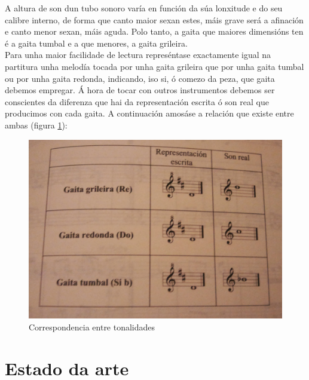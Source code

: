  A altura de son dun tubo sonoro varía en función da súa lonxitude e do seu
 calibre interno, de forma que canto maior sexan estes, máis grave será a
 afinación e canto menor sexan, máis aguda. Polo tanto, a gaita que maiores
 dimensións ten é a gaita tumbal e a que menores, a gaita grileira. \\

 Para unha maior facilidade de lectura represéntase exactamente igual na
 partitura unha melodía tocada por unha gaita grileira que por unha gaita
 tumbal ou por unha gaita redonda, indicando, iso si, ó comezo da peza, que
 gaita debemos empregar. Á hora de tocar con outros instrumentos debemos ser
 conscientes da diferenza que hai da representación escrita ó son real que
 producimos con cada gaita. A continuación amosáse a relación que existe entre
 ambas \cite{BrunoVillamorCaderno18} (figura
 \ref{figura:BrunoVillamorTonalidade}): \\

 \begin{figure}[htbp]
  \centering
  \includegraphics[scale=0.1,keepaspectratio=true]{./imagenes/bruno-villamor-tonalidade.jpg}
  \caption[Correspondencia entre tonalidades]{Correspondencia entre tonalidades \cite{BrunoVillamorCaderno18}}
  \label{figura:BrunoVillamorTonalidade}
 \end{figure}

\section{Estado da arte}

